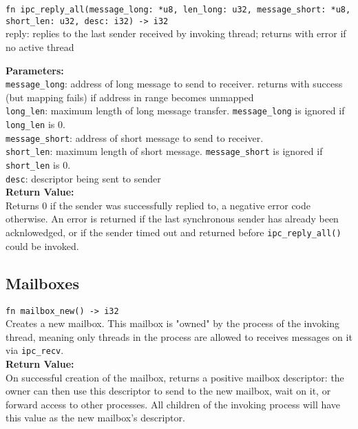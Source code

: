 \documentclass{article}
\begin{document}
\verb|fn ipc_reply_all(message_long: *u8, len_long: u32, message_short: *u8, short_len: u32, desc: i32) -> i32|\\
reply: replies to the last sender received by invoking thread; returns with error if no active thread

\textbf{Parameters:}\\
\verb|message_long|: address of long message to send to receiver.  returns with
                  success (but mapping fails) if address in range becomes unmapped \\

 \verb|long_len|: maximum length of long message transfer.  \verb|message_long| is ignored if \verb|long_len| is 0.   \\

 \verb|message_short|: address of short message to send to receiver.  \\

 \verb|short_len|: maximum length of short message.  \verb|message_short| is ignored if \verb|short_len| is 0.\\

 \verb|desc|: descriptor being sent to sender\\


\textbf{Return Value:}\\
Returns 0 if the sender was successfully replied to, a negative error code otherwise.  An error is returned if the last synchronous sender has already been acknlowedged, or if the sender timed out and returned before \verb|ipc_reply_all()| could be invoked.

\subsection{Mailboxes}
\verb|fn mailbox_new() -> i32| \\
Creates a new mailbox.  This mailbox is "owned" by the process of the invoking thread, meaning only threads in the process are allowed to receives messages on it via \verb|ipc_recv|. \\

\textbf{Return Value:}\\
On successful creation of the mailbox, returns a positive mailbox descriptor: the owner can then use this descriptor to send to the new mailbox, wait on it, or forward access to other processes.  All children of the invoking process will have this value as the new mailbox's descriptor.\\
\end{document}
